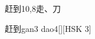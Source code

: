 \begin{entry}{赶到}{10,8}{⾛、⼑}
  \begin{phonetics}{赶到}{gan3 dao4}[][HSK 3]
  \end{phonetics}
\end{entry}
